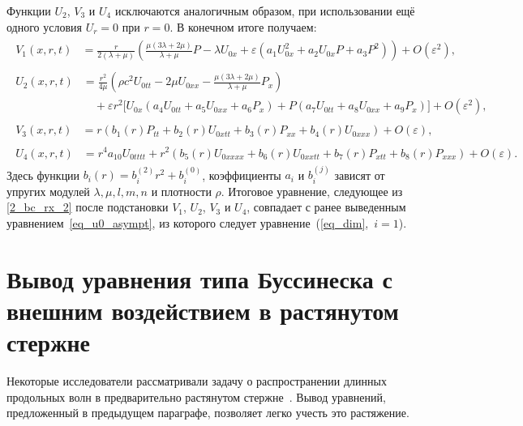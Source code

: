 \documentclass[12pt, a4paper]{report}
\begin{document}
Функции $U_2$, $V_3$ и $U_4$ исключаются аналогичным образом, при использовании ещё одного условия $U_r = 0$ при $r = 0$. В конечном итоге получаем:
\begin{align}
\begin{split}
V_1(x, r, t) &= \frac{r}{2(\lambda + \mu)} \left(\frac{ \mu(3\lambda + 2\mu)}{\lambda + \mu} P - \lambda U_{0x}  + \varepsilon (a_1 U_{0x}^2 + a_2 U_{0x} P + a_3 P^2) \right) + O(\varepsilon^2),
\end{split}\\
\begin{split}
U_2(x, r, t) &= \frac{r^2}{4\mu} \left(\rho c^2 U_{0tt} - 2\mu U_{0xx} - \frac{\mu(3\lambda + 2\mu)}{\lambda + \mu} P_x\right) \\
&\quad + \varepsilon r^2 \big[U_{0x} \left(a_4 U_{0tt} + a_5 U_{0xx} + a_6 P_x\right) + P(a_7 U_{0tt} + a_8 U_{0xx} + a_9 P_x)\big] + O(\varepsilon^2),
\end{split}\\
\begin{split}
V_3(x, r, t) &= r \left(b_1(r) P_{tt} + b_2(r) U_{0xtt} + b_3(r) P_{xx} + b_4(r) U_{0xxx}\right) + O(\varepsilon),
\end{split}\\
\begin{split}
U_4(x, r, t) &= r^4 a_{10} U_{0tttt} + r^2 \left(b_5(r) U_{0xxxx} + b_6(r) U_{0xxtt} + b_7(r) P_{xtt} + b_8(r) P_{xxx}\right) + O(\varepsilon).
\end{split}
\end{align}
Здесь функции $b_i(r) = b_{i}^{(2)}r^2 + b_{i}^{(0)}$, коэффициенты $a_i$ и $b_{i}^{(j)}$ зависят от упругих модулей $\lambda, \mu, l, m, n$ и плотности $\rho$.
Итоговое уравнение, следующее из \eqref{2_bc_rx_2} после подстановки $V_1$, $U_2$, $V_3$ и $U_4$, совпадает с ранее выведенным уравнением~\eqref{eq_u0_asympt}, из которого следует уравнение~(\ref{eq_dim},~$i=1$).


\section{Вывод уравнения типа Буссинеска с внешним воздействием в растянутом стержне}
Некоторые исследователи рассматривали задачу о распространении длинных продольных волн в предварительно растянутом стержне~\cite{DF}. Вывод уравнений, предложенный в предыдущем параграфе, позволяет легко учесть это растяжение.
\end{document}
